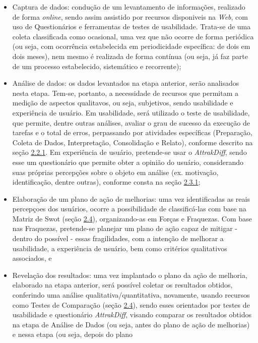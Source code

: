 \begin{itemize}
	\item Captura de dados: condução de um levantamento de informações, realizado de forma \textit{online}, sendo assim assistido por recursos disponiveis na \textit{Web}, com uso de Questionários e ferramentas de testes de usabilidade. Trata-se de uma coleta classificada como ocasional, uma vez que não ocorre de forma periódica (ou seja, com ocorrência estabelecida em periodicidade específica: de dois em dois meses), nem mesmo é realizada de forma contínua (ou seja, já faz parte de um processo estabelecido, sistemático e recorrente);
	\item Análise de dados: os dados levantados na etapa anterior, serão analisados nesta etapa. Tem-se, portanto, a necessidade de recursos que permitam a medição de aspectos qualitavos, ou seja, subjetivos, sendo usabilidade e experiência de usuário. Em usabilidade, será utilizado o teste de usabilidade, que permite, dentre outras análises, avaliar o grau de sucesso da execução de tarefas e o total de erros, perpassando por atividades específicas (Preparação, Coleta de Dados, Interpretação, Consolidação e Relato), conforme 
	descrito na seção \hyperref[sec:Medição1]{2.2.1}. Em experiência de usuário, pretende-se usar o \textit{AttrakDiff}, sendo esse um questionário que permite obter a opinião do usuário, considerando suas próprias percepções sobre o objeto em análise (ex. motivação, identificação, dentre outras), conforme consta na seção \hyperref[sec:Experiencia de Usuario]{2.3.1};
	\item Elaboração de um plano de ação de melhorias: uma vez identificadas as reais percepçoes dos usuários, ocorre a possibilidade de classificá-las com base na Matriz de Swot (seção \hyperref[sec:Teste de Comparação]{2.4}), organizando-as em Forças e Fraquezas. Com base nas Fraquezas, pretende-se planejar um plano de ação capaz de mitigar - dentro do possível - essas fragilidades, com a intenção de melhorar a usabilidade, a experiência de usuário, bem como critérios qualitativos associados, e
	\item Revelação dos resultados: uma vez implantado o plano da ação de melhoria, elaborado na etapa anterior, será possível coletar os resultados obtidos, conferindo uma análise qualitativa/quantitativa, novamente, usando recursos como Testes de Comparação (seção \hyperref[sec:Teste de Comparação]{2.4}), sendo esses orientados por testes de usabilidade e questionário \textit{AttrakDiff}, visando comparar os resultados obtidos na etapa de Análise de Dados (ou seja, antes do plano de ação de melhorias) e nessa etapa (ou seja, depois do plano 

\end{itemize}
